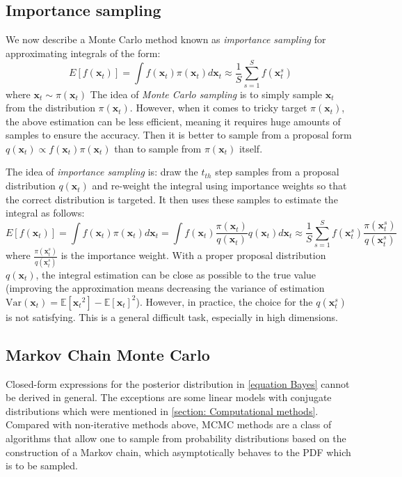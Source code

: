 \subsection{Importance sampling}
We now describe a Monte Carlo method known as \textit{importance sampling} for approximating integrals of the form:
\begin{equation}
    \label{eq: MC_intergral}
    E[f(\boldsymbol{x}_{t})] = \int f(\boldsymbol{x}_{t})\pi(\boldsymbol{x}_{t}) d\boldsymbol{x}_{t}
    \approx \frac{1}{S}\sum_{s=1}^{S} f(\boldsymbol{x}_{t}^{s})
\end{equation}
where $\boldsymbol{x}_{t} \sim \pi(\boldsymbol{x}_{t})$
The idea of \textit{Monte Carlo sampling} is to simply sample $\boldsymbol{x}_{t}$ from the distribution $\pi(\boldsymbol{x}_{t})$. However, when it comes to tricky target $\pi(\boldsymbol{x}_{t})$, the above estimation can be less efficient, meaning it requires huge amounts of samples to ensure the accuracy. Then it is better to sample from a proposal form $q(\boldsymbol{x}_{t}) \propto  f(\boldsymbol{x}_{t})\pi(\boldsymbol{x}_{t})$ than to sample from $\pi(\boldsymbol{x}_{t})$ itself.

The idea of \textit{importance sampling} is: draw the $t_{th}$ step samples from a proposal distribution $q(\boldsymbol{x}_{t})$ and re-weight the integral using importance weights so that the correct distribution is targeted. It then uses these samples to estimate the integral as follows:
\begin{equation}
    \label{eq: IS_integral}
    E[f(\boldsymbol{x}_{t})] = \int f(\boldsymbol{x}_{t})\pi(\boldsymbol{x}_{t}) d\boldsymbol{x}_{t} = \int f(\boldsymbol{x}_{t})\frac{\pi(\boldsymbol{x}_{t})}{q(\boldsymbol{x}_{t})}q(\boldsymbol{x}_{t}) d\boldsymbol{x}_{t}
    \approx \frac{1}{S} \sum_{s=1}^{S} f(\boldsymbol{x}_{t}^{s})\frac{\pi(\boldsymbol{x}_{t}^{s})}{q(\boldsymbol{x}_{t}^{s})}
\end{equation}
where $\frac{\pi(\boldsymbol{x}_{t}^{s})}{q(\boldsymbol{x}_{t}^{s})}$ is the importance weight. With a proper proposal distribution $q(\boldsymbol{x}_{t})$, the integral estimation can be close as possible to the true value (improving the approximation means decreasing the variance of estimation $\mathrm{Var}(\boldsymbol{x}_{t}) = \mathbb{E}[{\boldsymbol{x}_{t}}^2] - {\mathbb{E}[\boldsymbol{x}_{t}]}^2$). However, in practice, the choice for the $q(\boldsymbol{x}_{t}^{s})$ is not satisfying. This is a general difficult task, especially in high dimensions.


\subsection{Markov Chain Monte Carlo}
Closed-form expressions for the posterior distribution in \cref{equation Bayes} cannot be derived in general. The exceptions are some linear models with conjugate distributions which were mentioned in \cref{section: Computational methods}. Compared with non-iterative methods above, \acrfull{MCMC} methods are a class of algorithms that allow one to sample from probability distributions based on the construction of a Markov chain, which asymptotically behaves to the \acrshort{PDF} which is to be sampled.

